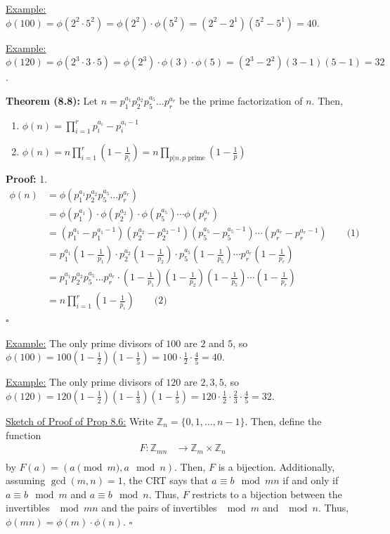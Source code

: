 \documentclass{article}
\newcommand*{\qed}{\hfill$\square$}%
\newcommand*{\zz}{\mathbb{Z}}%
\begin{document}
\underline{Example:} $\phi(100)=\phi(2^2\cdot 5^2)=\phi(2^2)\cdot \phi(5^2)=(2^2-2^1)(5^2-5^1)=40$.

\underline{Example:} $\phi(120)=\phi(2^3\cdot 3 \cdot 5)=\phi(2^3)\cdot \phi(3)\cdot \phi(5)=(2^3-2^2)(3-1)(5-1)=32$.

\textbf{Theorem (8.8):} Let $n=p_1^{a_1}p_2^{a_2}p_5^{a_5}\dots p_r^{a_r}$ be the prime factorization of $n$. Then, \begin{enumerate}
    \item $\phi(n)=\prod_{i=1}^r p_i^{a_i}-p_i^{a_i-1}$
    \item $\phi(n)=n\prod_{i=1}^r (1-\frac{1}{p_i})=n\prod_{p|n, p\text{ prime}}(1-\frac{1}{p})$
\end{enumerate}

\textbf{Proof:} 1. \begin{align*}
    \phi(n)&=\phi(p_1^{a_1}p_2^{a_2}p_5^{a_5}\dots p_r^{a_r})\\
    &=\phi(p_1^{a_1})\cdot \phi(p_2^{a_2})\cdot \phi(p_5^{a_5})\cdots \phi(p_r^{a_r})\\
    &=(p_1^{a_1}-p_1^{a_1-1})(p_2^{a_2}-p_2^{a_2-1})(p_5^{a_5}-p_5^{a_5-1})\cdots (p_r^{a_r}-p_r^{a_r-1}) \qquad \text{(1)}\\
    &=p_1^{a_1}(1-\frac{1}{p_1})\cdot p_2^{a_2}(1-\frac{1}{p_2})\cdot p_5^{a_5}(1-\frac{1}{p_5})\cdots p_r^{a_r}(1-\frac{1}{p_r})\\
    &= p_1^{a_1}p_2^{a_2}p_5^{a_5}\dots p_r^{a_r}\cdot (1-\frac{1}{p_1})(1-\frac{1}{p_2})(1-\frac{1}{p_5})\cdots (1-\frac{1}{p_r})\\
    &=n\prod_{i=1}^r (1-\frac{1}{p_i}) \qquad \text{(2)}
\end{align*}\qed

\underline{Example:} The only prime divisors of $100$ are $2$ and $5$, so $\phi(100)=100(1-\frac{1}{2})(1-\frac{1}{5})=100\cdot \frac{1}{2}\cdot \frac{4}{5}=40$.

\underline{Example:} The only prime divisors of $120$ are $2,3,5$, so $\phi(120)=120(1-\frac{1}{2})(1-\frac{1}{3})(1-\frac{1}{5})=120\cdot \frac{1}{2}\cdot \frac{2}{3}\cdot \frac{4}{5}=32$.

\underline{Sketch of Proof of Prop 8.6:} Write $\zz_n=\{0,1,\dots,n-1\}$. Then, define the function \begin{align*}
    F:\zz_{mn}&\to \zz_m\times \zz_n\\ 
\end{align*}by $F(a)=(a\pmod m, a\mod n)$. Then, $F$ is a bijection. Additionally, assuming $\gcd(m,n)=1$, the CRT says that $a\equiv b\mod mn$ if and only if $a\equiv b\mod m$ and $a\equiv b\mod n$. Thus, $F$ restricts to a bijection between the invertibles $\mod mn$ and the pairs of invertibles $\mod m$ and $\mod n$. Thus, $\phi(mn)=\phi(m)\cdot \phi(n)$. \qed 
\end{document}
